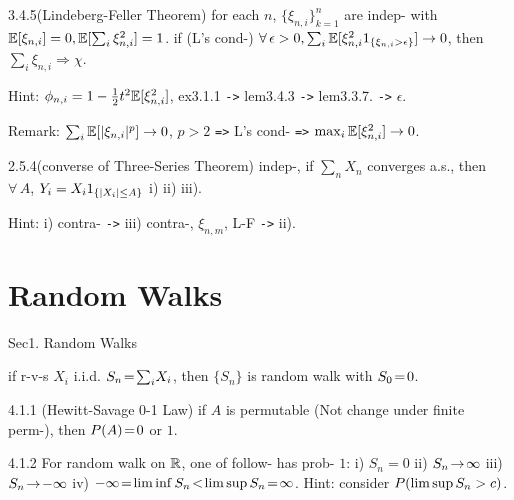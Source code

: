 \begin{lem}{3.4.5}(Lindeberg-Feller Theorem)
    \newline
    for each $n$, $\{\xi_{n,i}\}_{k=1}^n$ are indep- with $\mathbb{E}[\xi_{n,i}] = 0, \mathbb{E}[\sum_i \xi_{n, i}^2] = 1$.
    \newline if (L's cond-) $\forall\, \epsilon>0, \sum_i\mathbb{E}[\xi_{n, i}^2 1_{\{\xi_{n,i} > \epsilon\}}] \rightarrow 0$, then $\sum_i \xi_{n, i} \Rightarrow \chi$.
    
    Hint: $\phi_{n, i} = 1 - \frac12 t^2 \mathbb{E}[\xi_{n, i}^2]$, ex3.1.1 \verb|->| lem3.4.3 \verb|->| lem3.3.7. \verb|->| $\epsilon$.
    
    \vspace{-.5ex} Remark: $\sum_i \mathbb{E}[\lvert \xi_{n, i} \rvert^p] \rightarrow 0$, $p>2$ \verb|=>| L's cond- \verb|=>| $\max_i \mathbb{E}[\xi_{n, i}^2] \rightarrow 0$.
\end{lem}

\begin{thm}{2.5.4}(converse of Three-Series Theorem)
    \newline indep-, if $\sum_n X_n$ converges a.s., then $\forall\, A$, $Y_i = X_i 1_{\{\lvert X_i \rvert \leq A\}}$ i) ii) iii).
    
    Hint: i) contra- \verb|->| iii) contra-, $\xi_{n,m}$, L-F \verb|->| ii).
\end{thm}



\newpage


\section*{Random Walks}

Sec1. Random Walks \hrulefill

\begin{defi}
    if r-v-s $X_i$ i.i.d. $S_n \!=\! \sum_i \! X_i$, then $\{S_n\}$ is random walk with $S_0 \!=\! 0$.
\end{defi}

\begin{thm}{4.1.1} (Hewitt-Savage 0-1 Law) 
    \newline if $A$ is permutable (Not change under finite perm-), then $P ( A ) \!=\! 0$ or $1$.
\end{thm}

\begin{thm}{4.1.2} For random walk on $\mathbb{R}$, one of follow- has prob- $1$:
    \newline i) $S_n = 0$ ii) $S_n \!\rightarrow\! \infty$ iii) $S_n \!\rightarrow\! -\infty$ iv) $-\infty \!=\! \liminf S_n \!<\! \limsup S_n \!=\! \infty$.
    \newline Hint: consider $P ( \limsup S_n > c )$.
\end{thm}


